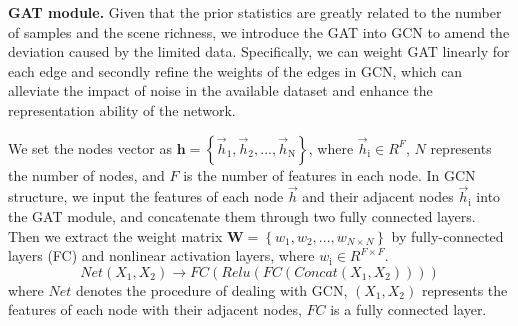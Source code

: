 \documentclass{article}
\begin{document}


\textbf{GAT module.} Given that the prior statistics are greatly related to the number of samples and the scene richness, we introduce the GAT into GCN to amend the deviation caused by the limited data. Specifically, we can weight GAT linearly for each edge and secondly refine the weights of the edges in GCN, which can alleviate the impact of noise in the available dataset and enhance the representation ability of the network. 

We set the nodes vector as $\textbf{h}=\left \{ {\overrightarrow{h}_{\text{1}}},{\overrightarrow{h}_{\text{2}}},...,{\overrightarrow{h}_{\text{N}}}\right \}$, where ${\overrightarrow{h}_{\text{i}}}\in R^{F}$, $N$ represents the number of nodes, and $F$ is the number of features in each node. In GCN structure, we input the features of each node $\overrightarrow{h}$ and their adjacent nodes $\overrightarrow{h}_{\text{i}}$ into the GAT module, and concatenate them through two fully connected layers. Then we extract the weight matrix $\textbf{W}= \left \{ w_{\text{1}},w_{\text{2}},...,w_{N\times N} \right \}$ by fully-connected layers (FC) and nonlinear activation layers, where $w_{\text{i}}\in R^{F\times F}$.
\setlength\abovedisplayskip{5pt}
\setlength\belowdisplayskip{5pt}
\begin{equation}
Net(X_\text{1},X_\text{2}) \rightarrow FC(Relu(FC(Concat(X_\text{1},X_\text{2}))))
\label{Eq(3)}
\end{equation}
\noindent
where $Net$ denotes the procedure of dealing with GCN, $(X_{\text{1}},X_{\text{2}})$ represents the features of each node with their adjacent nodes, $FC$ is a fully connected layer.
\end{document}
